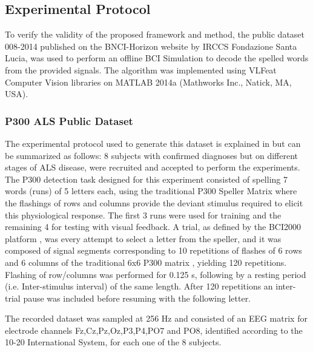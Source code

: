 \documentclass[entropy,article,submit,moreauthors,pdftex,10pt,a4paper]{mdpi}
\begin{document}


\subsection{Experimental Protocol} \label{Protocol}

To verify the validity of the proposed framework and method, the public dataset 008-2014  \citep{Riccio2013} published on the BNCI-Horizon website \citep{Brunner2014} by  IRCCS Fondazione Santa Lucia, was used to perform an offline BCI Simulation to decode the spelled words from the provided signals.  The algorithm was implemented using  VLFeat  \citep{Vedaldi2010} Computer Vision libraries on MATLAB 2014a (Mathworks Inc., Natick, MA, USA). 

\subsubsection{P300 ALS Public Dataset}

The experimental protocol used to generate this dataset is explained in \citep{Riccio2013} but can be summarized as follows:  8 subjects with confirmed diagnoses but on different stages of ALS disease, were recruited and accepted to perform the experiments. The P300 detection task designed for this experiment consisted of spelling 7 words (runs) of 5 letters each, using the traditional P300 Speller Matrix \citep{Farwell1988} where the flashings of rows and columns provide the deviant stimulus required to elicit this physiological response.  The first 3 runs were used for training and the remaining 4 for testing with visual feedback.  A trial, as defined by the BCI2000 platform \citep{Schalk2004}, was every attempt to select a letter from the speller, and it was composed of signal segments corresponding to 10 repetitions of flashes of 6 rows and 6 columns of the traditional 6x6 P300 matrix , yielding 120 repetitions.  Flashing of row/columns was performed for 0.125 s, following by a resting period (i.e. Inter-stimulus interval) of the same length.  After 120 repetitions an inter-trial pause was included before resuming with the following letter.

The recorded dataset was sampled at 256 Hz and consisted of an EEG matrix for electrode channels Fz,Cz,Pz,Oz,P3,P4,PO7 and PO8, identified according to the 10-20 International System,  for each one of the 8 subjects.  
\end{document}
